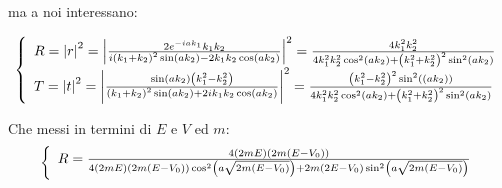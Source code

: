 ma  a noi interessano:

\begin{equation}
\lr\{.{\begin{array}{l}
	R = \lr||{r}^2 = \lr||{\frac{2e^{-i a k_1}k_1 k_2}{i\lrt{k_1+k_2}^2 \sin\lrt{a k_2}-2k_1 k_2 \cos\lrt{a k_2}}}^2=
	\frac{4 k_1^2 k_2^2}{4 k_1^2 k_2^2 \cos^2\lrt{a k_2}+\lrt{k_1^2+k_2^2}^2\sin^2\lrt{a k_2}}\\
	T = \lr||{t}^2 = \lr||{\frac{\sin\lrt{a k_2}\lrt{k_1^2-k_2^2}}{\lrt{k_1+k_2}^2 \sin\lrt{a k_2}+2 i k_1 k_2 \cos\lrt{a k_2}}}^2=
	\frac{\lrt{k_1^2-k_2^2}^2\sin^2\lrt{(a k_2)}}{4 k_1^2 k_2^2 \cos^2\lrt{a k_2}+\lrt{k_1^2+k_2^2}^2\sin^2\lrt{a k_2}}
	\end{array}}
\end{equation}

Che messi in termini di $E$ e $V$ ed $m$:
\begin{equation}
\lr\{.{\begin{array}{l}
	R = \frac{4 \lrt{2m E} \lrt{2m \lrt{E-V_0}}}{4 \lrt{2m E} \lrt{2m \lrt{E-V_0}} \cos^2\lrt{a \sqrt{2m \lrt{E-V_0}}}+2m \lrt{2 E-V_0}\sin^2\lrt{a \sqrt{2m \lrt{E-V_0}}}}%
	\end{array}}
\end{equation}

